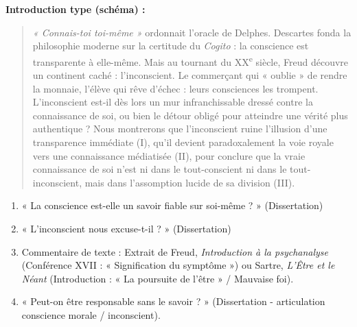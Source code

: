 \documentclass[11pt]{article}
\begin{document}
\begin{exoresolu}
\textbf{Introduction type (schéma) :}
\begin{quote}
\emph{« Connais-toi toi-même »} ordonnait l'oracle de Delphes. Descartes fonda la philosophie moderne sur la certitude du \emph{Cogito} : la conscience est transparente à elle-même. Mais au tournant du XX\textsuperscript{e} siècle, Freud découvre un continent caché : l'inconscient. Le commerçant qui « oublie » de rendre la monnaie, l'élève qui rêve d'échec : leurs consciences les trompent. L'inconscient est-il dès lors un mur infranchissable dressé contre la connaissance de soi, ou bien le détour obligé pour atteindre une vérité plus authentique ? Nous montrerons que l'inconscient ruine l'illusion d'une transparence immédiate (I), qu'il devient paradoxalement la voie royale vers une connaissance médiatisée (II), pour conclure que la vraie connaissance de soi n'est ni dans le tout-conscient ni dans le tout-inconscient, mais dans l'assomption lucide de sa division (III).
\end{quote}
\end{exoresolu}

\begin{exercice}
\begin{enumerate}
    \item « La conscience est-elle un savoir fiable sur soi-même ? » (Dissertation)
    \item « L'inconscient nous excuse-t-il ? » (Dissertation)
    \item Commentaire de texte : Extrait de Freud, \emph{Introduction à la psychanalyse} (Conférence XVII : « Signification du symptôme ») ou Sartre, \emph{L'Être et le Néant} (Introduction : « La poursuite de l'être » / Mauvaise foi).
    \item « Peut-on être responsable sans le savoir ? » (Dissertation - articulation conscience morale / inconscient).
\end{enumerate}
\end{exercice}
\end{document}
